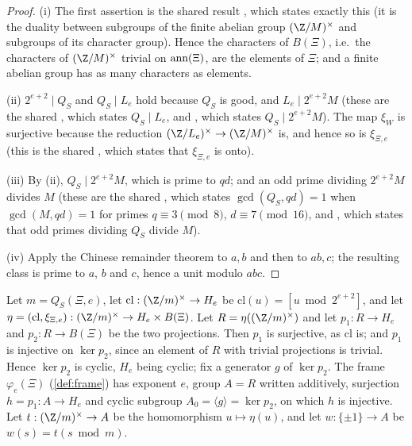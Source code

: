 \begin{proof}
(i) The first assertion is the shared result , which states exactly this (it is
the duality between subgroups of the finite abelian group $(\Z/M)^\times$ and subgroups of its character group). Hence
the characters of $B(\Xi)$, i.e.\ the characters of $(\Z/M)^\times$ trivial on $\operatorname{ann}(\Xi)$, are the elements of
$\Xi$; and a finite abelian group has as many characters as elements.

(ii) $2^{e+2}\mid Q_S$ and $Q_S\mid L_e$ hold because $Q_S$ is good, and $L_e\mid2^{e+2}M$ (these are the shared
, which states $Q_S\mid L_e$, and , which
states $Q_S\mid2^{e+2}M$). The map $\xi_W$ is surjective because the reduction $(\Z/L_e)^\times\to(\Z/M)^\times$ is, and hence
so is $\xi_{\Xi,e}$ (this is the shared , which states that $\xi_{\Xi,e}$ is onto).

(iii) By (ii), $Q_S\mid2^{e+2}M$, which is prime to $qd$; and an odd prime dividing $2^{e+2}M$ divides $M$ (these are the
shared , which states $\gcd(Q_S,qd)=1$ when $\gcd(M,qd)=1$ for primes
$q\equiv3\pmod8$, $d\equiv7\pmod{16}$, and , which states that odd primes
dividing $Q_S$ divide $M$).

(iv) Apply the Chinese remainder theorem to $a,b$ and then to $ab,c$; the resulting class is prime to $a$, $b$ and $c$,
hence a unit modulo $abc$.
\end{proof}

\begin{definition}\label{pf:top-supply:anyframe}
Let $m=Q_S(\Xi,e)$, let $\mathrm{cl}:(\Z/m)^\times\to H_e$ be $\mathrm{cl}(u)=[u\bmod2^{e+2}]$, and let
$\eta=(\mathrm{cl},\xi_{\Xi,e}):(\Z/m)^\times\to H_e\times B(\Xi)$. Let $R=\eta((\Z/m)^\times)$ and let $p_1:R\to H_e$ and
$p_2:R\to B(\Xi)$ be the two projections. Then $p_1$ is surjective, as $\mathrm{cl}$ is; and $p_1$ is injective on
$\ker p_2$, since an element of $R$ with trivial projections is trivial. Hence $\ker p_2$ is cyclic, $H_e$ being cyclic;
fix a generator $g$ of $\ker p_2$. The frame $\varphi_e(\Xi)$ (\cref{def:frame}) has exponent $e$, group $A=R$ written
additively, surjection $h=p_1:A\to H_e$ and cyclic subgroup $A_0=\langle g\rangle=\ker p_2$, on which $h$ is injective.
Let $t:(\Z/m)^\times\to A$ be the homomorphism $u\mapsto\eta(u)$, and let $w:\{\pm1\}\to A$ be $w(s)=t(s\bmod m)$.
  
  
\end{definition}

